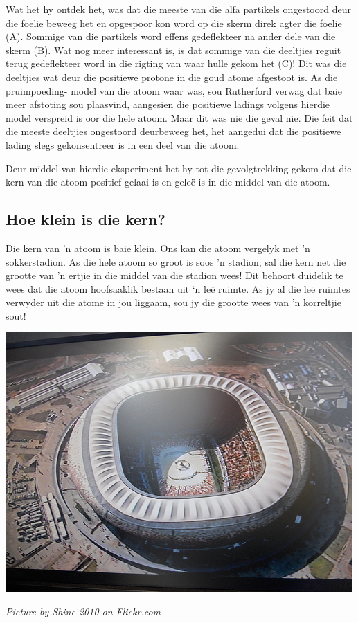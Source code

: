 \label{m38756*id254738}Wat het hy ontdek het, was dat die meeste van die alfa partikels ongestoord deur die foelie beweeg het en opgespoor kon
word op die skerm direk agter die foelie (A). Sommige van die partikels word effens gedeflekteer na ander dele van die skerm (B). Wat nog meer interessant is, is dat sommige van die deeltjies reguit terug gedeflekteer word in die rigting van waar hulle gekom het (C)! Dit was die deeltjies wat deur die positiewe protone in die goud atome afgestoot is. As die pruimpoeding- model van die atoom waar was, sou Rutherford verwag dat baie meer afstoting sou plaasvind, aangesien die positiewe ladings volgens hierdie model verspreid is oor die hele atoom. Maar dit was nie die geval nie. Die feit dat die meeste deeltjies ongestoord deurbeweeg het, het aangedui dat die positiewe lading slegs gekonsentreer is in een deel van die atoom.\par 
Deur middel van hierdie eksperiment het hy tot die gevolgtrekking gekom dat die kern van die atoom positief gelaai is en gele\"{e} is in die middel van die atoom.
\subsection*{Hoe klein is die kern?}
\begin{minipage}{.5\textwidth}
Die kern van 'n atoom is baie klein. Ons kan die atoom vergelyk met 'n sokkerstadion. As die hele atoom so groot is soos 'n stadion, sal die kern net die grootte van 'n ertjie in die middel van die stadion wees! Dit behoort duidelik te wees dat die atoom hoofsaaklik bestaan uit ‘n leë ruimte. As jy al die leë ruimtes verwyder uit die atome in jou liggaam, sou jy die grootte wees van 'n korreltjie sout!
\end{minipage}
\begin{minipage}{.5\textwidth}
\begin{center}
 \includegraphics[width=.4\textwidth]{photos/stadiumby-shine2010-flickr.jpg}\par
\textit{Picture by Shine 2010 on Flickr.com}
\end{center}
\end{minipage}
      \label{m38756*eip-491}
